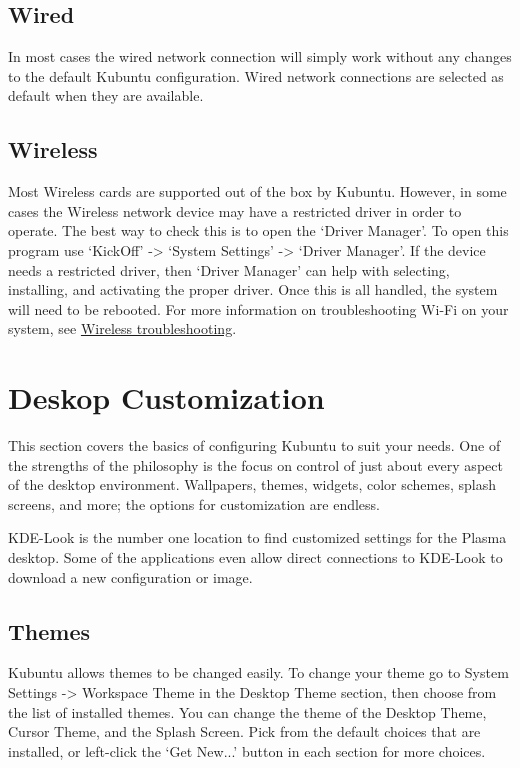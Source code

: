\documentclass[letterpaper,10pt,english]{sphinxmanual}
\begin{document}
\subsection{Wired}
\label{\detokenize{docs/basic:wired}}
In most cases the wired network connection will simply work without any changes to the default Kubuntu configuration. Wired network connections are selected as default when they are available.


\subsection{Wireless}
\label{\detokenize{docs/basic:wireless}}
Most Wireless cards are supported out of the box by Kubuntu. However, in some cases the Wireless network device may have a restricted driver in order to operate. The best way to check this is to open the `Driver Manager'. To open this program use `KickOff' -\textgreater{} `System Settings' -\textgreater{} `Driver Manager'. If the device needs a restricted driver, then `Driver Manager' can help with selecting, installing, and activating the proper driver. Once this is all handled, the system will need to be rebooted. For more information on troubleshooting Wi-Fi on your system, see \href{https://help.ubuntu.com/community/WifiDocs/WirelessTroubleShootingGuide}{Wireless troubleshooting}.


\section{Deskop Customization}
\label{\detokenize{docs/basic:deskop-customization}}
This section covers the basics of configuring Kubuntu to suit your needs. One of the strengths of the  philosophy is the focus on control of just about every aspect of the desktop environment. Wallpapers, themes, widgets, color schemes, splash screens, and more; the options for customization are endless.

KDE-Look is the number one location to find customized settings for the  Plasma desktop. Some of the applications even allow direct connections to KDE-Look to download a new configuration or image.


\subsection{Themes}
\label{\detokenize{docs/basic:themes}}
Kubuntu allows themes to be changed easily. To change your theme go to System Settings -\textgreater{} Workspace Theme in the Desktop Theme section, then choose from the list of installed themes. You can change the theme of the Desktop Theme, Cursor Theme, and the Splash Screen. Pick from the default choices that are installed, or left-click the `Get New...' button in each section for more choices.
\end{document}
